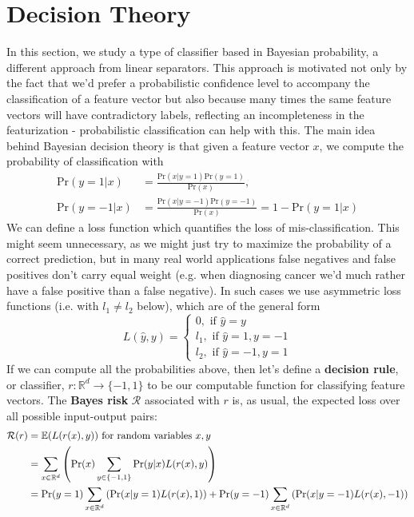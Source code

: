 \documentclass{article}
\begin{document}
\section{Decision Theory}
In this section, we study a type of classifier based in Bayesian probability, a different approach from linear separators. This approach is motivated not only by the fact that we'd prefer a probabilistic confidence level to accompany the classification of a feature vector but also because many times the same feature vectors will have contradictory labels, reflecting an incompleteness in the featurization - probabilistic classification can help with this. The main idea behind Bayesian decision theory is that given a feature vector $ x $, we compute the probability of classification with
$$ \begin{aligned}
	\text{Pr}(y = 1 | x) &= \frac{\text{Pr}(x | y = 1) \text{Pr}(y = 1)}{\text{Pr}(x)}, \\
        \text{Pr}(y = -1 | x) &= \frac{\text{Pr}(x | y = -1) \text{Pr}(y = -1)}{\text{Pr}(x)} = 1 - \text{Pr}(y = 1 | x)
\end{aligned} $$
We can define a loss function which quantifies the loss of mis-classification. This might seem unnecessary, as we might just try to maximize the probability of a correct prediction, but in many real world applications false negatives and false positives don't carry equal weight (e.g. when diagnosing cancer we'd much rather have a false positive than a false negative). In such cases we use asymmetric loss functions (i.e. with $ l_1 \neq l_2 $ below), which are of the general form
$$ L(\hat{y}, y) = \begin{cases}
	0, \text{ if } \hat{y} = y \\
	l_1, \text{ if } \hat{y} = 1, y = -1 \\
	l_2, \text{ if } \hat{y} = -1, y = 1
\end{cases} $$
If we can compute all the probabilities above, then let's define a \textbf{decision rule}, or classifier, $ r: \mathbb{R}^d \rightarrow \{ -1, 1 \} $ to be our computable function for classifying feature vectors. The \textbf{Bayes risk} $ \mathcal{R} $ associated with $ r $ is, as usual, the expected loss over all possible input-output pairs:
$$ \begin{aligned}
	\mathcal{R}(r) &= \mathbb{E}(L(r(x), y)) \text{ for random variables $ x, y $} \\
	&= \sum_{x \in \mathbb{R}^d} \left( \text{Pr}(x) \sum_{y \in \{ -1, 1 \}} \text{Pr}(y | x) L(r(x), y) \right) \\
	&= \text{Pr}(y = 1) \sum_{x \in \mathbb{R}^d} \left( \text{Pr}(x | y = 1) L(r(x), 1) \right) + \text{Pr}(y = -1) \sum_{x \in \mathbb{R}^d} \left( \text{Pr}(x | y = -1) L(r(x), -1) \right)
\end{aligned} $$
\end{document}
